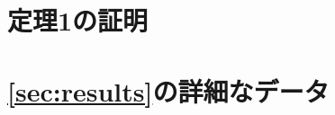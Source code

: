 \appendix

\chapter{定理1の証明}\label{ch:appendix1}

\chapter{\cref{sec:results}の詳細なデータ}\label{ch:appendix2}